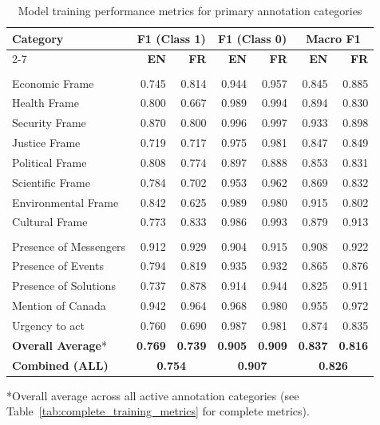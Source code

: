 \documentclass[12pt]{article}
\renewcommand\_{\texttt{\detokenize{_}\allowbreak}}
\begin{document}
\begin{table}[b!]
\centering
\caption{Model training performance metrics for primary annotation categories}
\label{tab:performance}
\small
\begin{tabular}{l|rr|rr|rr}
\toprule
\rowcolor{gray!10}
\textbf{Category} & \multicolumn{2}{c}{\textbf{F1 (Class 1)}} & \multicolumn{2}{c}{\textbf{F1 (Class 0)}} & \multicolumn{2}{c}{\textbf{Macro F1}} \\
\cline{2-7}
\rowcolor{gray!10}
& \textbf{EN} & \textbf{FR} & \textbf{EN} & \textbf{FR} & \textbf{EN} & \textbf{FR} \\
\midrule
\rowcolor{gray!10}
\multicolumn{7}{l}{\textit{Thematic Frames}} \\
\midrule
Economic Frame & 0.745 & 0.814 & 0.944 & 0.957 & 0.845 & 0.885 \\
Health Frame & 0.800 & 0.667 & 0.989 & 0.994 & 0.894 & 0.830 \\
Security Frame & 0.870 & 0.800 & 0.996 & 0.997 & 0.933 & 0.898 \\
Justice Frame & 0.719 & 0.717 & 0.975 & 0.981 & 0.847 & 0.849 \\
Political Frame & 0.808 & 0.774 & 0.897 & 0.888 & 0.853 & 0.831 \\
Scientific Frame & 0.784 & 0.702 & 0.953 & 0.962 & 0.869 & 0.832 \\
Environmental Frame & 0.842 & 0.625 & 0.989 & 0.980 & 0.915 & 0.802 \\
Cultural Frame & 0.773 & 0.833 & 0.986 & 0.993 & 0.879 & 0.913 \\
\midrule
\rowcolor{gray!10}
\multicolumn{7}{l}{\textit{Other Primary Categories: Actors, Events and Solutions}} \\
\midrule
Presence of Messengers & 0.912 & 0.929 & 0.904 & 0.915 & 0.908 & 0.922 \\
Presence of Events & 0.794 & 0.819 & 0.935 & 0.932 & 0.865 & 0.876 \\
Presence of Solutions & 0.737 & 0.878 & 0.914 & 0.944 & 0.825 & 0.911 \\
Mention of Canada & 0.942 & 0.964 & 0.968 & 0.980 & 0.955 & 0.972 \\
Urgency to act & 0.760 & 0.690 & 0.987 & 0.981 & 0.874 & 0.835 \\
\midrule
\rowcolor{gray!15}
\textbf{Overall Average}* & \textbf{0.769} & \textbf{0.739} & \textbf{0.905} & \textbf{0.909} & \textbf{0.837} & \textbf{0.816} \\
\rowcolor{gray!15}
\textbf{Combined (ALL)} & \multicolumn{2}{c}{\textbf{0.754}} & \multicolumn{2}{c}{\textbf{0.907}} & \multicolumn{2}{c}{\textbf{0.826}} \\
\bottomrule
\end{tabular}

\vspace{0.3em}
\noindent\footnotesize
*Overall average across all active annotation categories (see Table~\ref{tab:complete_training_metrics} for complete metrics).
\end{table}
\end{document}
